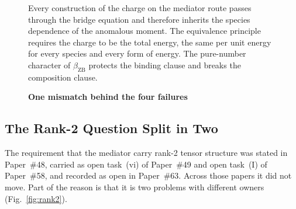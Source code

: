 \documentclass[%
 reprint, amsmath,amssymb, aps, prb, ]{revtex4-2}
\numberwithin{equation}{section}
\newcommand{\vZB}{v_{\text{ZB}}}
\newcommand{\betaZB}{\beta_{\text{ZB}}}
\newcommand{\lambdaC}{\lambda_{\text{C}}}
\newcommand{\nuZB}{\nu_{\text{ZB}}}
\newcommand{\OmT}{\Omega_{\text{T}}}
\begin{document}
\begin{figure}[t!]
\centering
{}
\caption{\textbf{One mismatch behind the four failures}}
\label{fig:mismatch}
\vspace{0.4em}
\begin{minipage}{0.95\textwidth}
\justifying\small
Every construction of the charge on the mediator route passes through the bridge equation and therefore inherits the species dependence of the anomalous moment. The equivalence principle requires the charge to be the total energy, the same per unit energy for every species and every form of energy. The pure-number character of $\betaZB$ protects the binding clause and breaks the composition clause.
\end{minipage}
\end{figure}

\subsection{The Rank-2 Question Split in Two}
\label{subsec:rank2}

The requirement that the mediator carry rank-2 tensor structure was stated in Paper~\#48, carried as open task~(vi) of Paper~\#49 and open task~(I) of Paper~\#58, and recorded as open in Paper~\#63. Across those papers it did not move. Part of the reason is that it is two problems with different owners (Fig.~\ref{fig:rank2}).
\end{document}
